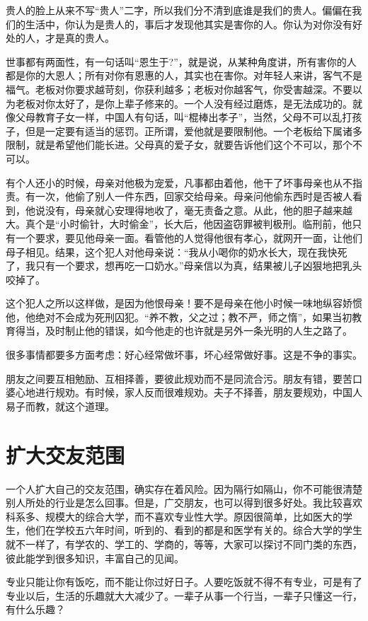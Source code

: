 \documentclass[fontset=fandol, a4paper, 12pt, openright]{ctexbook}
\begin{document}
贵人的脸上从来不写“贵人”二字，所以我们分不清到底谁是我们的贵人。偏偏在我们的生活中，你认为是贵人的，事后才发现他其实是害你的人。你认为对你没有好处的人，才是真的贵人。

世事都有两面性，有一句话叫“恩生于?”，就是说，从某种角度讲，所有害你的人都是你的大恩人；所有对你有恩惠的人，其实也在害你。对年轻人来讲，客气不是福气。老板对你要求越苛刻，你获利越多；老板对你越客气，你受害越深。不要以为老板对你太好了，是你上辈子修来的。一个人没有经过磨炼，是无法成功的。就像父母教育子女一样，中国人有句话，叫“棍棒出孝子”，当然，父母不可以乱打孩子，但是一定要有适当的惩罚。正所谓，爱他就是要限制他。一个老板给下属诸多限制，就是希望他们能长进。父母真的爱子女，就要告诉他们这个不可以，那个不可以。

有个人还小的时候，母亲对他极为宠爱，凡事都由着他，他干了坏事母亲也从不指责。有一次，他偷了别人一件东西，回家交给母亲。母亲问他偷东西时是否被人看到，他说没有，母亲就心安理得地收了，毫无责备之意。从此，他的胆子越来越大。真个是“小时偷针，大时偷金”，长大后，他因盗窃罪被判极刑。临刑前，他只有一个要求，要见他母亲一面。看管他的人觉得他很有孝心，就网开一面，让他们母子相见。结果，这个犯人对他母亲说：“我从小喝你的奶水长大，现在我快死了，我只有一个要求，想再吃一口奶水。”母亲信以为真，结果被儿子凶狠地把乳头咬掉了。

这个犯人之所以这样做，是因为他恨母亲！要不是母亲在他小时候一味地纵容娇惯他，他绝对不会成为死刑囚犯。“养不教，父之过；教不严，师之惰”，如果当初教育得当，及时制止他的错误，如今他走的也许就是另外一条光明的人生之路了。

很多事情都要多方面考虑：好心经常做坏事，坏心经常做好事。这是不争的事实。

朋友之间要互相勉励、互相择善，要彼此规劝而不是同流合污。朋友有错，要苦口婆心地进行规劝。有时候，家人反而很难规劝。夫子不择善，朋友要规劝，中国人易子而教，就这个道理。

\section{扩大交友范围}

一个人扩大自己的交友范围，确实存在着风险。因为隔行如隔山，你不可能很清楚别人所处的行业是怎么回事。但是，广交朋友，也可以得到很多好处。我比较喜欢科系多、规模大的综合大学，而不喜欢专业性大学。原因很简单，比如医大的学生，他们在学校五六年时间，听到的、看到的都是和医学有关的。综合大学的学生就不一样了，有学农的、学工的、学商的，等等，大家可以探讨不同门类的东西，彼此能学到很多知识，丰富自己的见闻。

专业只能让你有饭吃，而不能让你过好日子。人要吃饭就不得不有专业，可是有了专业以后，生活的乐趣就大大减少了。一辈子从事一个行当，一辈子只懂这一行，有什么乐趣？
\end{document}
